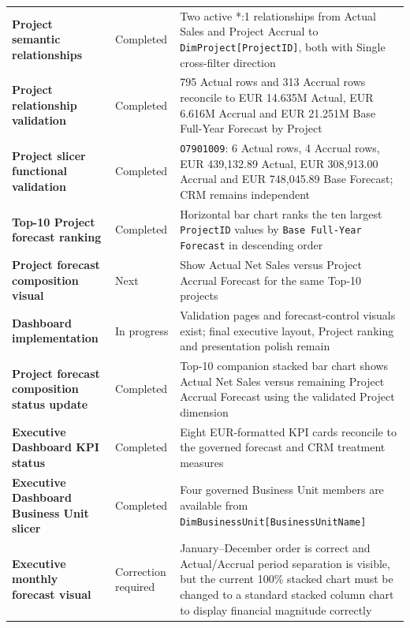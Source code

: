 \documentclass[11pt,a4paper]{article}
\begin{document}
\begin{tabularx}{\textwidth}{
    >{\bfseries}p{5.8cm}
    p{2.8cm}
    X
}
Project semantic relationships
&
Completed
&
Two active *:1 relationships from Actual Sales and Project Accrual to
\texttt{DimProject[ProjectID]}, both with Single cross-filter direction
\\

Project relationship validation
&
Completed
&
795 Actual rows and 313 Accrual rows reconcile to EUR 14.635M Actual,
EUR 6.616M Accrual and EUR 21.251M Base Full-Year Forecast by Project
\\

Project slicer functional validation
&
Completed
&
\texttt{O7901009}: 6 Actual rows, 4 Accrual rows, EUR 439,132.89 Actual,
EUR 308,913.00 Accrual and EUR 748,045.89 Base Forecast; CRM remains independent
\\

Top-10 Project forecast ranking
&
Completed
&
Horizontal bar chart ranks the ten largest \texttt{ProjectID} values by
\texttt{Base Full-Year Forecast} in descending order
\\

Project forecast composition visual
&
Next
&
Show Actual Net Sales versus Project Accrual Forecast for the same Top-10 projects
\\

Dashboard implementation
&
In progress
&
Validation pages and forecast-control visuals exist; final executive layout,
Project ranking and presentation polish remain
\\

Project forecast composition status update
&
Completed
&
Top-10 companion stacked bar chart shows Actual Net Sales versus remaining
Project Accrual Forecast using the validated Project dimension
\\

Executive Dashboard KPI status
&
Completed
&
Eight EUR-formatted KPI cards reconcile to the governed forecast and CRM
treatment measures
\\

Executive Dashboard Business Unit slicer
&
Completed
&
Four governed Business Unit members are available from
\texttt{DimBusinessUnit[BusinessUnitName]}
\\

Executive monthly forecast visual
&
Correction required
&
January--December order is correct and Actual/Accrual period separation is visible,
but the current 100\% stacked chart must be changed to a standard stacked column
chart to display financial magnitude correctly
\\


\end{tabularx}
\end{document}
